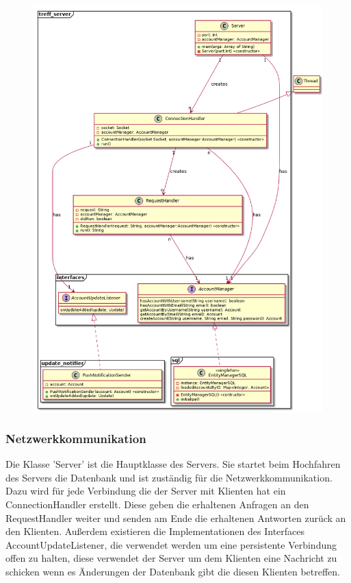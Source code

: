 \documentclass[parskip=full,11pt]{scrartcl}
\begin{document}
\begin{figure}
    \centering
    \includegraphics[width = \columnwidth / 3 * 2]{server.png}
	\label{fig:lists}
\end{figure}


\subsubsection{Netzwerkkommunikation}
Die Klasse 'Server' ist die Hauptklasse des Servers.
Sie startet beim Hochfahren des Servers die Datenbank und ist zuständig für
die Netzwerkkommunikation. Dazu wird für jede Verbindung die der Server mit
Klienten hat ein ConnectionHandler erstellt. Diese geben die erhaltenen
Anfragen an den RequestHandler weiter und senden am Ende die erhaltenen
Antworten zurück an den Klienten.
Außerdem existieren die Implementationen des Interfaces AccountUpdateListener,
die verwendet werden um eine persistente Verbindung offen zu halten, diese
verwendet der Server um dem Klienten eine Nachricht zu schicken wenn es
Änderungen der Datenbank gibt die diesen Klienten betreffen.
\end{document}
